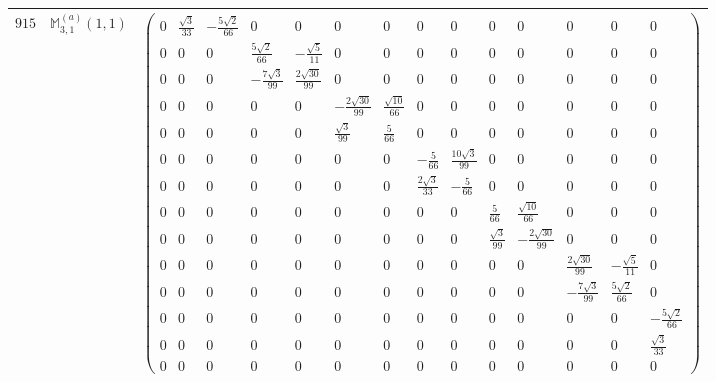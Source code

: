\documentclass[fleqn,8pt,landscape]{jsarticle}
\begin{document}
\begin{center}
\begin{longtable}{ccc}
$ 915 $ & $ \mathbb{M}_{3,1}^{(a)}(1,1) $ & $ \begin{pmatrix} 0 & \frac{\sqrt{3}}{33} & - \frac{5 \sqrt{2}}{66} & 0 & 0 & 0 & 0 & 0 & 0 & 0 & 0 & 0 & 0 & 0 \\ 0 & 0 & 0 & \frac{5 \sqrt{2}}{66} & - \frac{\sqrt{5}}{11} & 0 & 0 & 0 & 0 & 0 & 0 & 0 & 0 & 0 \\ 0 & 0 & 0 & - \frac{7 \sqrt{3}}{99} & \frac{2 \sqrt{30}}{99} & 0 & 0 & 0 & 0 & 0 & 0 & 0 & 0 & 0 \\ 0 & 0 & 0 & 0 & 0 & - \frac{2 \sqrt{30}}{99} & \frac{\sqrt{10}}{66} & 0 & 0 & 0 & 0 & 0 & 0 & 0 \\ 0 & 0 & 0 & 0 & 0 & \frac{\sqrt{3}}{99} & \frac{5}{66} & 0 & 0 & 0 & 0 & 0 & 0 & 0 \\ 0 & 0 & 0 & 0 & 0 & 0 & 0 & - \frac{5}{66} & \frac{10 \sqrt{3}}{99} & 0 & 0 & 0 & 0 & 0 \\ 0 & 0 & 0 & 0 & 0 & 0 & 0 & \frac{2 \sqrt{3}}{33} & - \frac{5}{66} & 0 & 0 & 0 & 0 & 0 \\ 0 & 0 & 0 & 0 & 0 & 0 & 0 & 0 & 0 & \frac{5}{66} & \frac{\sqrt{10}}{66} & 0 & 0 & 0 \\ 0 & 0 & 0 & 0 & 0 & 0 & 0 & 0 & 0 & \frac{\sqrt{3}}{99} & - \frac{2 \sqrt{30}}{99} & 0 & 0 & 0 \\ 0 & 0 & 0 & 0 & 0 & 0 & 0 & 0 & 0 & 0 & 0 & \frac{2 \sqrt{30}}{99} & - \frac{\sqrt{5}}{11} & 0 \\ 0 & 0 & 0 & 0 & 0 & 0 & 0 & 0 & 0 & 0 & 0 & - \frac{7 \sqrt{3}}{99} & \frac{5 \sqrt{2}}{66} & 0 \\ 0 & 0 & 0 & 0 & 0 & 0 & 0 & 0 & 0 & 0 & 0 & 0 & 0 & - \frac{5 \sqrt{2}}{66} \\ 0 & 0 & 0 & 0 & 0 & 0 & 0 & 0 & 0 & 0 & 0 & 0 & 0 & \frac{\sqrt{3}}{33} \\ 0 & 0 & 0 & 0 & 0 & 0 & 0 & 0 & 0 & 0 & 0 & 0 & 0 & 0 \end{pmatrix} $ \\ \hline

\end{longtable}
\end{center}
\end{document}

